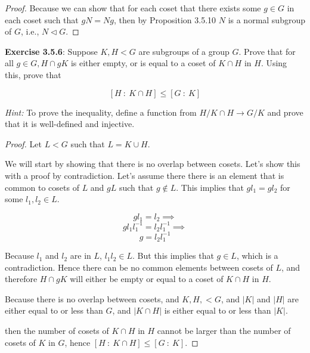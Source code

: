 \documentclass[a4paper]{article}
\begin{document}
\begin{myparindent}{0pt}
\begin{proof}
  Because we can show that for each coset that there exists some $g \in G$ in
  each coset such that $gN = Ng$, then by Proposition 3.5.10 $N$ is a normal
  subgroup of $G$, i.e., $N \triangleleft G$.
\end{proof}

\textbf{Exercise 3.5.6}:
Suppose $K, H < G$ are subgroups of a group $G$. Prove that for all $g \in G,
H \cap gK$ is either empty, or is equal to a coset of $K \cap H$ in $H$. Using
this, prove that

\[ [H ~: ~K \cap H] \le [G ~: ~K] \]

\textit{Hint:} To prove the inequality, define a function from $H/K \cap H
\rightarrow G/K$ and prove that it is well-defined and injective.
\begin{proof}
  Let $L < G$ such that $L = K \cup H$.

  We will start by showing that there is no overlap between cosets. Let's show
  this with a proof by contradiction. Let's assume there there is an element
  that is common to cosets of $L$ and $gL$ such that $g \notin L$.
  This implies that $g l_1 = g l_2$ for some $l_1, l_2 \in L$.

  \[ g l_1 = l_2 \implies \]
  \[ g l_1 l_1^{-1} = l_2 l_1^{-1} \implies \]
  \[ g = l_2 l_1^{-1} \]

  Because $l_1$ and $l_2$ are in $L$, $l_1 l_2 \in L$. But this implies that
  $g \in L$, which is a contradiction. Hence there can be no common elements
  between cosets of $L$, and therefore $H \cap gK$ will either be empty or
  equal to a coset of $K \cap H$ in $H$. \newline

  Because there is no overlap between cosets, and $K, H, < G$, and $|K|$ and
  $|H|$ are either equal to or less than $G$, and $|K \cap H|$ is either equal
  to or less than $|K|$.

  then the number of cosets of $K \cap H$ in $H$ cannot be larger than the
  number of cosets of $K$ in $G$, hence $[H ~: ~K \cap H] \le [G ~: ~K]$.
\end{proof}

\end{myparindent}
\end{document}
